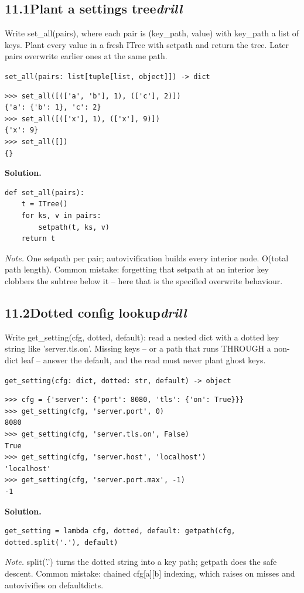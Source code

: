 \documentclass[10pt,letterpaper]{book}
\begin{document}
\subsection*{11.1\quad Plant a settings tree\hfill\textnormal{\textit{drill}}}
Write set\_all(pairs), where each pair is (key\_path, value) with key\_path a list of keys. Plant every value in a fresh ITree with setpath and return the tree. Later pairs overwrite earlier ones at the same path.

\noindent\texttt{set\_all(pairs: list[tuple[list, object]]) -> dict}
\begin{lstlisting}[style=ex]
>>> set_all([(['a', 'b'], 1), (['c'], 2)])
{'a': {'b': 1}, 'c': 2}
>>> set_all([(['x'], 1), (['x'], 9)])
{'x': 9}
>>> set_all([])
{}
\end{lstlisting}
\noindent\textbf{Solution.}
\begin{lstlisting}[style=code]
def set_all(pairs):
    t = ITree()
    for ks, v in pairs:
        setpath(t, ks, v)
    return t
\end{lstlisting}
\noindent\textit{Note.} One setpath per pair; autovivification builds every interior node. O(total path length). Common mistake: forgetting that setpath at an interior key clobbers the subtree below it -- here that is the specified overwrite behaviour.

\subsection*{11.2\quad Dotted config lookup\hfill\textnormal{\textit{drill}}}
Write get\_setting(cfg, dotted, default): read a nested dict with a dotted key string like 'server.tls.on'. Missing keys -- or a path that runs THROUGH a non-dict leaf -- answer the default, and the read must never plant ghost keys.

\noindent\texttt{get\_setting(cfg: dict, dotted: str, default) -> object}
\begin{lstlisting}[style=ex]
>>> cfg = {'server': {'port': 8080, 'tls': {'on': True}}}
>>> get_setting(cfg, 'server.port', 0)
8080
>>> get_setting(cfg, 'server.tls.on', False)
True
>>> get_setting(cfg, 'server.host', 'localhost')
'localhost'
>>> get_setting(cfg, 'server.port.max', -1)
-1
\end{lstlisting}
\noindent\textbf{Solution.}
\begin{lstlisting}[style=code]
get_setting = lambda cfg, dotted, default: getpath(cfg, dotted.split('.'), default)
\end{lstlisting}
\noindent\textit{Note.} split('.') turns the dotted string into a key path; getpath does the safe descent. Common mistake: chained cfg[a][b] indexing, which raises on misses and autovivifies on defaultdicts.
\end{document}
